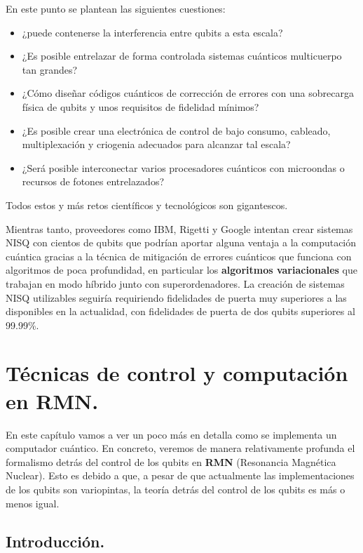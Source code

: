 En este punto se plantean las siguientes cuestiones:
\begin{itemize}
\item ¿puede contenerse la interferencia entre qubits a esta escala? 
\item ¿Es posible entrelazar de forma controlada sistemas cuánticos multicuerpo tan grandes? 
\item ¿Cómo diseñar códigos cuánticos de corrección de errores con una sobrecarga física de qubits y unos requisitos de fidelidad mínimos? 
\item ¿Es posible crear una electrónica de control de bajo consumo, cableado, multiplexación y criogenia adecuados para alcanzar tal escala?
\item ¿Será posible interconectar varios procesadores cuánticos con microondas o recursos de fotones entrelazados? 
\end{itemize}
Todos estos y más retos científicos y tecnológicos son gigantescos.

Mientras tanto, proveedores como IBM, Rigetti y Google intentan crear sistemas NISQ con cientos de qubits que podrían aportar alguna ventaja a la computación cuántica gracias a la técnica de mitigación de errores cuánticos que funciona con algoritmos de poca profundidad, en particular los \textbf{algoritmos variacionales} que trabajan en modo híbrido junto con superordenadores. La creación de sistemas NISQ utilizables seguiría requiriendo fidelidades de puerta muy superiores a las disponibles en la actualidad, con fidelidades de puerta de dos qubits superiores al 99.99\%.











\chapter{Técnicas de control y computación en RMN.}

En este capítulo vamos a ver un poco más en detalla como se implementa un computador cuántico. En concreto, veremos de manera relativamente profunda el formalismo detrás del control de los qubits en \textbf{RMN} (Resonancia Magnética Nuclear). Esto es debido a que, a pesar de que actualmente las implementaciones de los qubits son variopintas, la teoría detrás del control de los qubits es más o menos igual. 

	\section{Introducción.}

